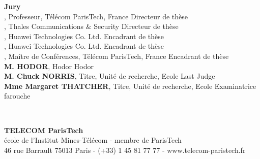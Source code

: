 \vfill

\begin{minipage}{.9\textwidth}	%
  \textbf{Jury}\\

\textbf{\JeanLouis}, {\small Professeur, Télécom ParisTech, France}
	\hfill Directeur de thèse\\
\textbf{\Vania}, {\small Thales Communications \& Security}
	\hfill Directeur de thèse\\
\textbf{\Paolo}, {\small Huawei Technologies Co. Ltd.}
	\hfill Encadrant de thèse\\
\textbf{\Jeremie}, {\small Huawei Technologies Co. Ltd.}
	\hfill Encadrant de thèse\\
\textbf{\Claude}, {\small Maître de Conférences, Télécom ParisTech, France}
	\hfill Encadrant de thèse\\
\textbf{M. HODOR}, {\small Hodor}
	\hfill Hodor\\
\textbf{M. Chuck NORRIS}, {\small Titre, Unité de recherche, Ecole}
	\hfill Last Judge\\
\textbf{Mme Margaret THATCHER}, {\small Titre, Unité de recherche, Ecole}
	\hfill Examinatrice farouche\\

\end{minipage}\\

\vspace{-.3cm}

\begin{center}
	
\textbf{TELECOM ParisTech}\\
{\small école de l'Institut Mines-Télécom - membre de ParisTech}\\
{\tiny 46 rue Barrault 75013 Paris - (+33) 1 45 81 77 77 - www.telecom-paristech.fr}
\end{center}


\restoregeometry
